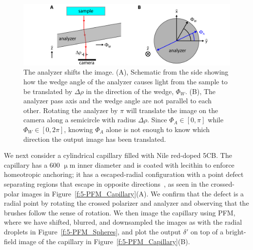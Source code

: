 \begin{figure}
  \centering
  \includegraphics{figures/C5/Ch5-Figs_AnalyzerShift.png}
  \caption{The analyzer shifts the image.
  (A), Schematic from the side showing how the wedge angle of the analyzer causes light from the sample to be translated by $\Delta\rho$ in the direction of the wedge, $\Phi_W$.
  (B), The analyzer pass axis and the wedge angle are not parallel to each other.
  Rotating the analyzer by $\pi$ will translate the image on the camera along a semicircle with radius $\Delta\rho$.
  Since $\Phi_A \in [0, \pi]$ while $\Phi_W \in [0, 2 \pi]$, knowing $\Phi_A$ alone is not enough to know which direction the output image has been translated.}\label{f:5-AnalyzerShift}
\end{figure}

We next consider a cylindrical capillary filled with Nile red-doped 5CB.\@
The capillary has a 600 $\upmu$m inner diameter and is coated with lecithin to enforce homeotropic anchoring; it has a escaped-radial configuration with a point defect separating regions that escape in opposite directions~\cite{RN179}, as seen in the crossed-polar images in Figure~\ref{f:5-PFM_Capillary}(A).
We confirm that the defect is a radial point by rotating the crossed polarizer and analyzer and observing that the brushes follow the sense of rotation.
We then image the capillary using PFM, where we have shifted, blurred, and downsampled the images as with the radial droplets in Figure~\ref{f:5-PFM_Spheres}, and plot the output $\delta'$ on top of a bright-field image of the capillary in Figure~\ref{f:5-PFM_Capillary}(B).


